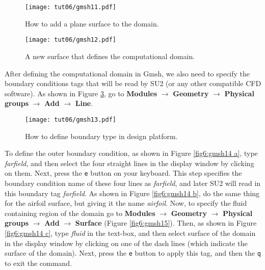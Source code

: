 \begin{figure}[htbp]
    \centering
    \texttt{[image: tut06/gmsh11.pdf]}
    \caption{How to add a plane surface to the domain.}
    \label{fig6:gmsh11}
\end{figure}
\begin{figure}[htbp]
    \centering
    \texttt{[image: tut06/gmsh12.pdf]}
    \caption{A new surface that defines the computational domain.}
    \label{fig6:gmsh12}
\end{figure}
After defining the computational domain in Gmsh, we also need to specify the boundary conditions tags that will be read by SU2 (or any other compatible CFD software). As shown in Figure \ref{fig6:gmsh13}, go to \textbf{Modules} $\rightarrow$ \textbf{Geometry} $\rightarrow$ \textbf{Physical groups} $\rightarrow$ \textbf{Add} $\rightarrow$ \textbf{Line}.
\begin{figure}[htbp]
    \centering
    \texttt{[image: tut06/gmsh13.pdf]}
    \caption{How to define boundary type in design platform.}
    \label{fig6:gmsh13}
\end{figure}
To define the outer boundary condition, as shown in Figure \ref{fig6:gmsh14 a}, type \textit{farfield}, and then select the four straight lines in the display window by clicking on them. Next, press the \texttt{e} button on your keyboard. This step specifies the boundary condition name of these four lines as \textit{farfield}, and later SU2 will read in this boundary tag \textit{farfield}. As shown in Figure \ref{fig6:gmsh14 b}, do the same thing for the airfoil surface, but giving it the name \textit{airfoil}. Now, to specify the fluid containing region of the domain go to \textbf{Modules} $\rightarrow$ \textbf{Geometry} $\rightarrow$ \textbf{Physical groups} $\rightarrow$ \textbf{Add} $\rightarrow$ \textbf{Surface} (Figure \ref{fig6:gmsh15}). Then, as shown in Figure \ref{fig6:gmsh14 c}, type \textit{fluid} in the text-box, and then select surface of the domain in the display window by clicking on one of the dash lines (which indicate the surface of the domain). Next, press the \texttt{e} button to apply this tag, and then the \texttt{q} to exit the command.
